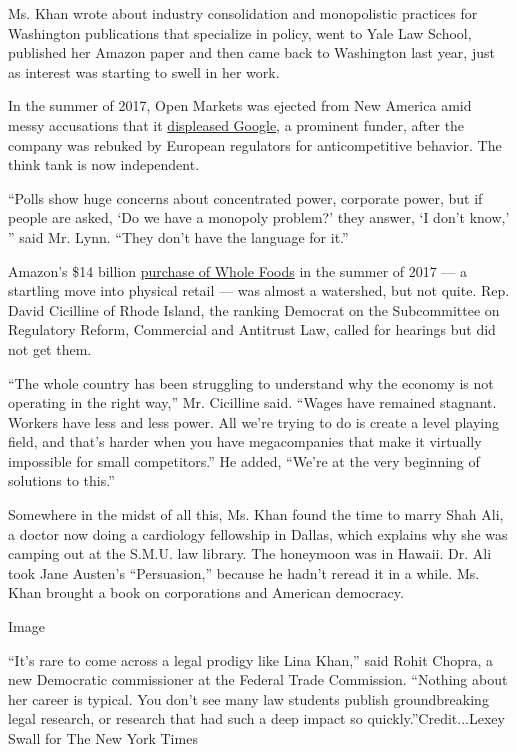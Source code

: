 Ms. Khan wrote about industry consolidation and monopolistic practices
for Washington publications that specialize in policy, went to Yale Law
School, published her Amazon paper and then came back to Washington last
year, just as interest was starting to swell in her work.

In the summer of 2017, Open Markets was ejected from New America amid
messy accusations that it
\href{https://www.nytimes3xbfgragh.onion/2017/08/30/us/politics/eric-schmidt-google-new-america.html}{displeased
Google}, a prominent funder, after the company was rebuked by European
regulators for anticompetitive behavior. The think tank is now
independent.

``Polls show huge concerns about concentrated power, corporate power,
but if people are asked, `Do we have a monopoly problem?' they answer,
`I don't know,' '' said Mr. Lynn. ``They don't have the language for
it.''

Amazon's \$14 billion
\href{https://www.nytimes3xbfgragh.onion/2017/06/16/business/dealbook/amazon-whole-foods.html}{purchase
of Whole Foods} in the summer of 2017 --- a startling move into physical
retail --- was almost a watershed, but not quite. Rep. David Cicilline
of Rhode Island, the ranking Democrat on the Subcommittee on Regulatory
Reform, Commercial and Antitrust Law, called for hearings but did not
get them.

``The whole country has been struggling to understand why the economy is
not operating in the right way,'' Mr. Cicilline said. ``Wages have
remained stagnant. Workers have less and less power. All we're trying to
do is create a level playing field, and that's harder when you have
megacompanies that make it virtually impossible for small competitors.''
He added, ``We're at the very beginning of solutions to this.''

Somewhere in the midst of all this, Ms. Khan found the time to marry
Shah Ali, a doctor now doing a cardiology fellowship in Dallas, which
explains why she was camping out at the S.M.U. law library. The
honeymoon was in Hawaii. Dr. Ali took Jane Austen's ``Persuasion,''
because he hadn't reread it in a while. Ms. Khan brought a book on
corporations and American democracy.

Image

``It's rare to come across a legal prodigy like Lina Khan,'' said Rohit
Chopra, a new Democratic commissioner at the Federal Trade Commission.
``Nothing about her career is typical. You don't see many law students
publish groundbreaking legal research, or research that had such a deep
impact so quickly.''Credit...Lexey Swall for The New York Times

